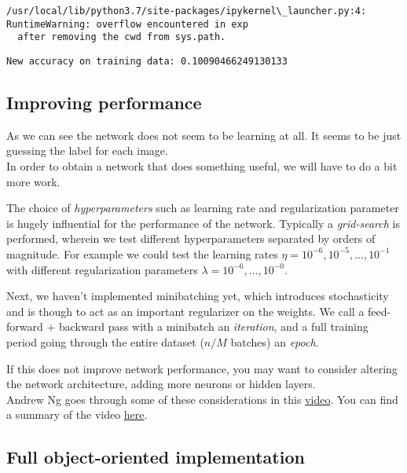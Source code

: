 \documentclass[11pt]{article}
\begin{document}
    \begin{Verbatim}[commandchars=\\\{\}]
/usr/local/lib/python3.7/site-packages/ipykernel\_launcher.py:4: RuntimeWarning: overflow encountered in exp
  after removing the cwd from sys.path.

    \end{Verbatim}

    \begin{Verbatim}[commandchars=\\\{\}]
New accuracy on training data: 0.10090466249130133

    \end{Verbatim}

    \hypertarget{improving-performance}{%
\subsection{Improving performance}\label{improving-performance}}

As we can see the network does not seem to be learning at all. It seems
to be just guessing the label for each image.\\
In order to obtain a network that does something useful, we will have to
do a bit more work.

The choice of \emph{hyperparameters} such as learning rate and
regularization parameter is hugely influential for the performance of
the network. Typically a \emph{grid-search} is performed, wherein we
test different hyperparameters separated by orders of magnitude. For
example we could test the learning rates
\(\eta = 10^{-6}, 10^{-5},...,10^{-1}\) with different regularization
parameters \(\lambda = 10^{-6},...,10^{-0}\).

Next, we haven't implemented minibatching yet, which introduces
stochasticity and is though to act as an important regularizer on the
weights. We call a feed-forward + backward pass with a minibatch an
\emph{iteration}, and a full training period going through the entire
dataset (\(n/M\) batches) an \emph{epoch}.

If this does not improve network performance, you may want to consider
altering the network architecture, adding more neurons or hidden
layers.\\
Andrew Ng goes through some of these considerations in this
\href{https://youtu.be/F1ka6a13S9I}{video}. You can find a summary of
the video
\href{https://kevinzakka.github.io/2016/09/26/applying-deep-learning/}{here}.

\hypertarget{full-object-oriented-implementation}{%
\subsection{Full object-oriented
implementation}\label{full-object-oriented-implementation}}
\end{document}
